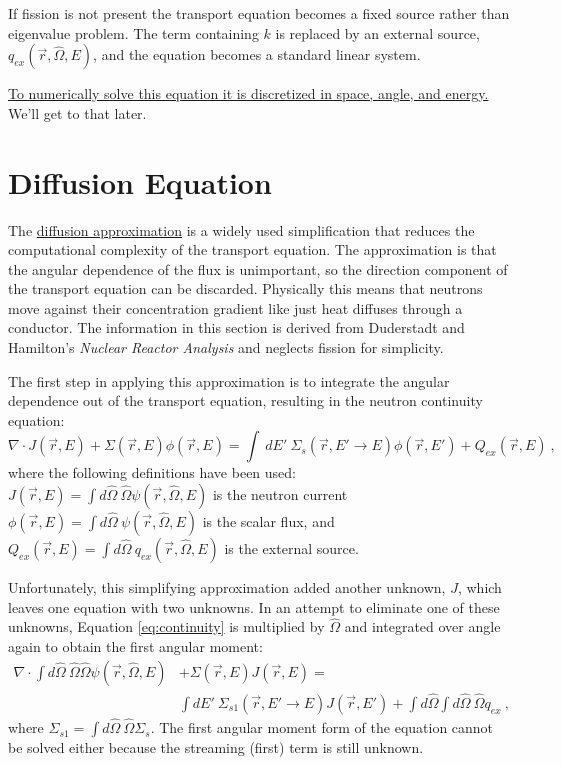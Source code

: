 \documentclass[12pt]{article}
\newcommand{\Macro}{\ensuremath{\Sigma}}
\newcommand{\vOmega}{\ensuremath{\hat{\Omega}}}
\begin{document}
If fission is not present the transport equation becomes a fixed source rather than eigenvalue problem. The term containing $k$ is replaced by an external source, $q_{ex}(\vec{r}, \hat{\Omega}, E)$, and the equation becomes a standard linear system. 

\underline{To numerically solve this equation it is discretized in space, angle, and energy.} We'll get to that later.

\section{Diffusion Equation}

The \underline{diffusion approximation} is a widely used simplification that reduces the computational complexity of the transport equation. The approximation is that the angular dependence of the flux is unimportant, so the direction component of the transport equation can be discarded. Physically this means that neutrons move against their concentration gradient like just heat diffuses through a conductor. The information in this section is derived from Duderstadt and Hamilton's \emph{Nuclear Reactor Analysis} and neglects fission for simplicity. 

The first step in applying this approximation is to integrate the angular dependence out of the transport equation, resulting in the neutron continuity equation:
%
\begin{equation}
  \nabla \cdot J(\vec{r},E) + \Macro(\vec{r},E)\phi(\vec{r},E) = \int \:dE' \:\Macro_{s}(\vec{r}, E' \to E)\phi(\vec{r},E') + Q_{ex}(\vec{r},E) \:,
  \label{eq:continuity} 
\end{equation}
%
where the following definitions have been used:\\
\indent $J(\vec{r},E) = \int d\vOmega \:\vOmega \psi(\vec{r}, \vOmega, E)$ is the neutron current \\
\indent  $\phi(\vec{r},E) = \int d\vOmega \:\psi(\vec{r}, \vOmega, E)$ is the scalar flux, and \\
\indent $Q_{ex} (\vec{r},E)= \int d\vOmega \:q_{ex}(\vec{r}, \vOmega, E)$ is the external source.

Unfortunately, this simplifying approximation added another unknown, $J$, which leaves one equation with two unknowns. In an attempt to eliminate one of these unknowns, Equation \eqref{eq:continuity} is multiplied by $\hat{\Omega}$ and integrated over angle again to obtain the first angular moment:
%
\begin{align}
  \nabla \cdot \int  d\vOmega \:\vOmega \vOmega \psi(\vec{r}, \vOmega, E) &+ \Macro(\vec{r},E) J(\vec{r},E)= \nonumber \\
  &\int dE' \:\Macro_{s1}(\vec{r}, E' \to E)J(\vec{r},E') + \int d\vOmega \int d\vOmega \:\vOmega q_{ex} \:,
  \label{eq:current1}
\end{align}
%
where $\Macro_{s1}  = \int d\vOmega \:\vOmega \Macro_{s}$. The first angular moment form of the equation cannot be solved either because the streaming (first) term is still unknown. 
\end{document}

